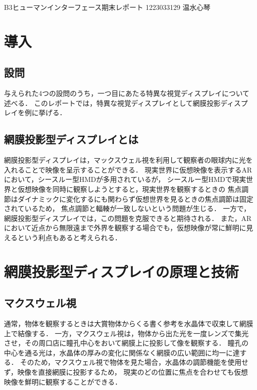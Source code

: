\documentclass[dvipdfmx]{ujarticle}
\begin{document}
\begin{flushleft}
    B3ヒューマンインターフェース期末レポート\hspace{\fill}
    1223033129 温水心琴
\end{flushleft}


\section{導入}
\subsection{設問}
与えられた4つの設問のうち，一つ目にあたる特異な視覚ディスプレイについて述べる．
このレポートでは，特異な視覚ディスプレイとして網膜投影ディスプレイを例に挙げる．

\subsection{網膜投影型ディスプレイとは}
網膜投影型ディスプレイは，マックスウェル視を利用して観察者の眼球内に光を入れることで映像を呈示することができる．
現実世界に仮想映像を表示するARにおいて，シースルー型HMDが多用されているが，
シースルー型HMDで現実世界と仮想映像を同時に観察しようとすると，現実世界を観察するときの
焦点調節はダイナミックに変化するにも関わらず仮想世界を見るときの焦点調節は固定されているため，
焦点調節と輻輳が一致しないという問題が生じる．
一方で，網膜投影型ディスプレイでは，この問題を克服できると期待される．
また，ARにおいて近点から無限遠まで外界を観察する場合でも，仮想映像が常に鮮明に見えるという利点もあると考えられる．
\cite{3DIC2000}

\section{網膜投影型ディスプレイの原理と技術}
\subsection{マクスウェル視}
通常，物体を観察するときは大賞物体からくる書く参考を水晶体で収束して網膜上で結像する．
一方，マクスウェル視は，物体から出た光を一度レンズで集光させ，その周口店に瞳孔中心をおいて網膜上に投影して像を観察する．
瞳孔の中心を通る光は，水晶体の厚みの変化に関係なく網膜の広い範囲に均一に達する．
そのため，マクスウェル視で物体を見た場合，水晶体の調節機能を使用せず，映像を直接網膜に投影するため，
現実のどの位置に焦点を合わせても仮想映像を鮮明に観察することができる．
\cite{FIT2002}
\cite{RetinalPSD}
\end{document}
